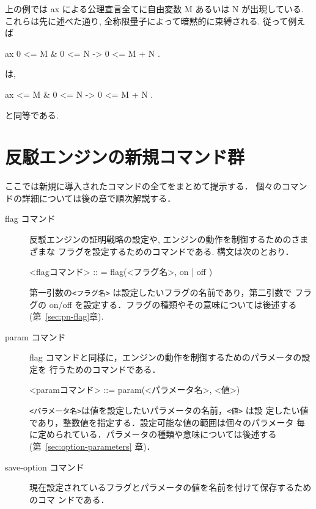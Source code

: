 上の例では ax による公理宣言全てに自由変数 M あるいは N が出現している. 
これらは先に述べた通り, 全称限量子によって暗黙的に束縛される.
従って例えば
\begin{simplev}
    ax 0 <= M & 0 <= N -> 0 <= M + N .
\end{simplev}
は,
\begin{simplev}
    ax  <= M & 0 <= N -> 0 <= M + N .
\end{simplev}
と同等である.

\section{反駁エンジンの新規コマンド群}
\label{sec:new-commands}
ここでは新規に導入されたコマンドの全てをまとめて提示する．
個々のコマンドの詳細については後の章で順次解説する．
\begin{description}
\item[flag コマンド]
  反駁エンジンの証明戦略の設定や, エンジンの動作を制御するためのさまざまな
  フラグを設定するためのコマンドである.
  構文は次のとおり． 

\begin{vvtm}
\begin{simplev}
  <flagコマンド> :: = flag(<フラグ名>, { on | off })
\end{simplev}
\end{vvtm}

第一引数の\texttt{<フラグ名>} は設定したいフラグの名前であり，第二引数で
  フラグの on/off を設定する．フラグの種類やその意味については後述する
  (第~\ref{sec:pn-flag}章). 

\item[param コマンド]
  flag コマンドと同様に，エンジンの動作を制御するためのパラメータの設定を
  行うためのコマンドである．

\begin{vvtm}
\begin{simplev}
   <paramコマンド> ::= param(<パラメータ名>, <値>)
\end{simplev}
\end{vvtm}

\texttt{<パラメータ名>}は値を設定したいパラメータの名前，\texttt{<値>} は設
定したい値であり，整数値を指定する．設定可能な値の範囲は個々のパラメータ
毎に定められている．パラメータの種類や意味については後述する
(第~\ref{sec:option-parameters} 章)．

\item[save-option コマンド]

  現在設定されているフラグとパラメータの値を名前を付けて保存するためのコマ
  ンドである．


\end{description}
